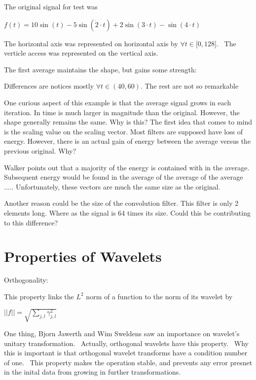 \documentclass{article}
\begin{document}
The original signal for test was

\qquad $f(t)=10\sin (t)-5\sin (\dot{2}\cdot t)+2\sin (3\cdot t)-\sin (4\cdot
t)$

The horizontal axis was represented on horizontal axis by $\forall t\in
\lbrack 0,128]$. \ The verticle access was represented on the vertical axis.

\bigskip

The first average maintains the shape, but gains some strength:

\bigskip

Differences are notices mostly $\forall t\in (40,60)$. The rest are not so
remarkable

\bigskip

One curious aspect of this example is that the average signal grows in each
iteration. In time is much larger in magnitude than the original. However,
the shape generally remains the same. Why is this? The first idea that comes
to mind is the scaling value on the scaling vector. Most filters are
supposed have loss of energy. However, there is an actual gain of energy
between the average versus the previous original. Why?

Walker points out that a majority of the energy is contained with in the
average. Subsequent energy would be found in the average of the average of
the average ..... Unfortunately, these vectors are much the same size as the
original.

Another reason could be the size of the convolution filter. This filter is
only 2 elements long. Where as the signal is 64 times its size. Could this
be contributing to this difference?

\bigskip

\section{Properties of Wavelets}

Orthogonality:

This property links the $L^{2}$ norm of a function to the norm of its
wavelet by

$||f||=\sqrt{\sum_{j,l}\gamma _{j,l}^{2}}$

One thing, Bjorn Jawerth and Wim Sweldens saw an importance on wavelet's
unitary transformation. \ Actually, orthogonal wavelets have this property.
\ Why this is important is that orthogonal wavelet transforms have a
condition number of one. \ This property makes the operation stable, and
prevents any error presnet in the inital data from growing in further
transformations. \ 
\end{document}

